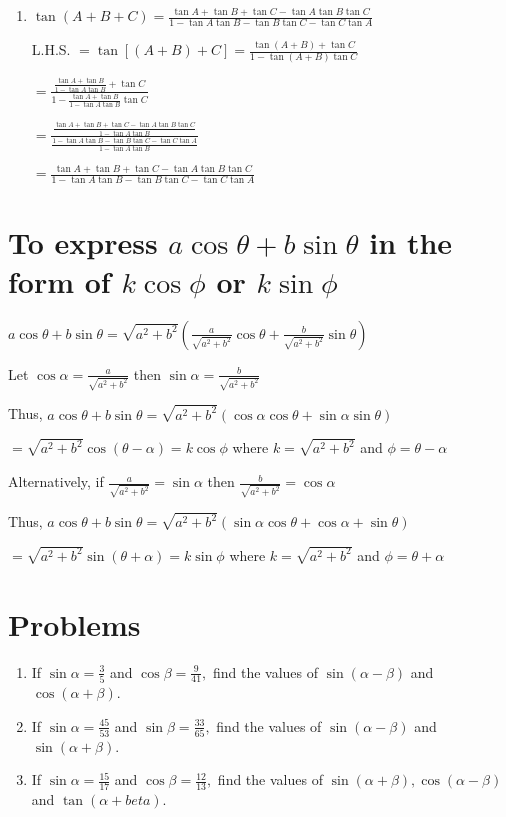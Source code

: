 \begin{enumerate}
\item $\tan(A + B + C) = \frac{\tan A + \tan B + \tan C - \tan A\tan B\tan C}{1 - \tan A\tan B - \tan B\tan C - \tan C\tan A}$

   L.H.S. $= \tan[(A + B) + C] = \frac{\tan(A + B) + \tan C}{1 - \tan(A + B)\tan C}$

   $= \frac{\frac{\tan A + \tan B}{1 - \tan A\tan B} + \tan C}{1 - \frac{\tan A + \tan B}{1 - \tan A\tan B}\tan C}$

   $= \frac{\frac{\tan A + \tan B + \tan C - \tan A\tan B\tan C}{1 - \tan A\tan B}}{\frac{1 - \tan A\tan B - \tan B\tan C -
   \tan C\tan A}{1 - \tan A\tan B}}$

   $= \frac{\tan A + \tan B + \tan C - \tan A\tan B\tan C}{1 - \tan A\tan B - \tan B\tan C - \tan C\tan A}$
\end{enumerate}

\section{To express $a\cos\theta + b\sin\theta$ in the form of $k\cos\phi$ or $k\sin\phi$}
$a\cos\theta + b\sin\theta = \sqrt{a^2 + b^2}\left(\frac{a}{\sqrt{a^2 + b^2}}\cos\theta + \frac{b}{\sqrt{a^2 +
b^2}}\sin\theta\right)$

Let $\cos\alpha = \frac{a}{\sqrt{a^2 + b^2}}$ then $\sin\alpha = \frac{b}{\sqrt{a^2 + b^2}}$

Thus, $a\cos\theta + b\sin\theta = \sqrt{a^2 + b^2}(\cos\alpha\cos\theta + \sin\alpha\sin\theta)$

$= \sqrt{a^2 + b^2}\cos(\theta - \alpha) = k\cos\phi$ where $k = \sqrt{a^2 + b^2}$ and $\phi = \theta - \alpha$

Alternatively, if $\frac{a}{\sqrt{a^2 + b^2}} = \sin\alpha$ then $\frac{b}{\sqrt{a^2 + b^2}} = \cos\alpha$

Thus, $a\cos\theta + b\sin\theta = \sqrt{a^2 + b^2}(\sin\alpha\cos\theta + \cos\alpha + \sin\theta)$

$= \sqrt{a^2 + b^2}\sin(\theta + \alpha) = k\sin\phi$ where $k = \sqrt{a^2+b^2}$ and $\phi = \theta + \alpha$

\section{Problems}
\begin{enumerate}
\item If $\sin\alpha = \frac{3}{5}$ and $\cos\beta = \frac{9}{41},$ find the values of $\sin(\alpha - \beta)$ and
   $\cos(\alpha + \beta)$.

\item If $\sin\alpha = \frac{45}{53}$ and $\sin\beta = \frac{33}{65},$ find the values of $\sin(\alpha - \beta)$ and
   $\sin(\alpha + \beta)$.

\item If $\sin\alpha = \frac{15}{17}$ and $\cos\beta = \frac{12}{13},$ find the values of $\sin(\alpha + \beta),
   \cos(\alpha - \beta)$ and $\tan(\alpha + beta)$.
\end{enumerate}

